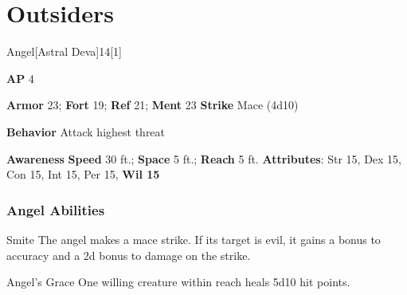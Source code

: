 \section{Outsiders}
\begin{monsection}{Angel}[Astral Deva]{14}[1]
\vspace{-1em}\vspace{-1em}
\begin{spellcontent}
\begin{spelltargetinginfo}
{\textbf{AP} 4}

\pari \textbf{Armor} 23;
\textbf{Fort} 19;
\textbf{Ref} 21;
\textbf{Ment} 23
\pari \textbf{Strike} Mace  (4d10)



\pari \textbf{Behavior} Attack highest threat
\end{spelltargetinginfo}
\end{spellcontent}

\begin{monsterfooter}
\pari \textbf{Awareness} 
\pari \textbf{Speed} 30 ft.;
\textbf{Space} 5 ft.;
\textbf{Reach} 5 ft.
\pari \textbf{Attributes}:
Str 15,
Dex 15,
Con 15,
Int 15,
Per 15,
\textbf{Wil 15}
\end{monsterfooter}
\end{monsection}


\subsubsection{Angel Abilities}

\begin{ability}{Smite}
The angel makes a mace strike.
If its target is evil, it gains a  bonus to accuracy and a \plus2d bonus to damage on the strike.
\end{ability}

\vspace{0.5em}
\begin{ability}{Angel's Grace}
One willing creature within reach heals 5d10 hit points.
\end{ability}

